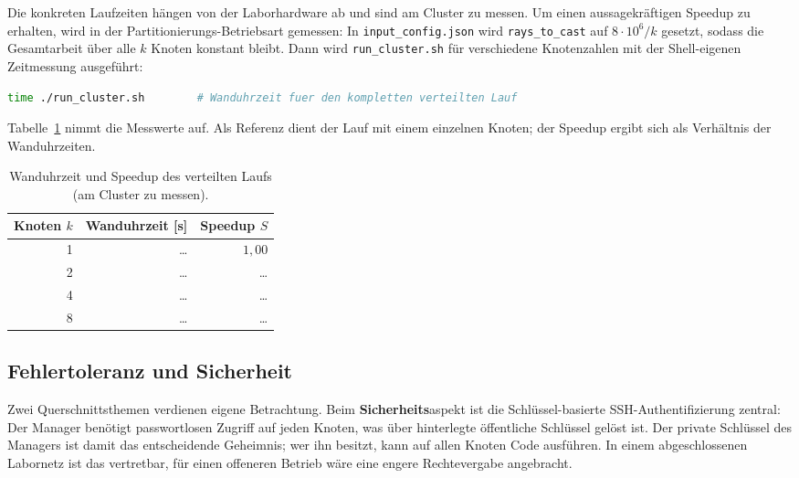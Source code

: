 Die konkreten Laufzeiten hängen von der Laborhardware ab und sind am Cluster zu
messen. Um einen aussagekräftigen Speedup zu erhalten, wird in der
Partitionierungs-Betriebsart gemessen: In \texttt{input\_config.json} wird
\texttt{rays\_to\_cast} auf $8\cdot10^{6}/k$ gesetzt, sodass die Gesamtarbeit über
alle $k$ Knoten konstant bleibt. Dann wird \texttt{run\_cluster.sh} für
verschiedene Knotenzahlen mit der Shell-eigenen Zeitmessung ausgeführt:

\begin{lstlisting}[style=clusterlst, language=bash, caption={Messvorschrift für die Laufzeit am Cluster.}]
time ./run_cluster.sh        # Wanduhrzeit fuer den kompletten verteilten Lauf
\end{lstlisting}

Tabelle~\ref{tab:speedup} nimmt die Messwerte auf. Als Referenz dient der Lauf mit
einem einzelnen Knoten; der Speedup ergibt sich als Verhältnis der Wanduhrzeiten.

\begin{table}[htbp]
    \centering
    \caption{Wanduhrzeit und Speedup des verteilten Laufs (am Cluster zu messen).}
    \label{tab:speedup}
    \begin{tabular}{r r r}
        \toprule
        Knoten $k$ & Wanduhrzeit [s] & Speedup $S$ \\
        \midrule
        1 & \dots & $1{,}00$ \\
        2 & \dots & \dots \\
        4 & \dots & \dots \\
        8 & \dots & \dots \\
        \bottomrule
    \end{tabular}
\end{table}

\subsection{Fehlertoleranz und Sicherheit}
\label{subsec:cluster-fehler}

Zwei Querschnittsthemen verdienen eigene Betrachtung. Beim \textbf{Sicherheits}aspekt
ist die Schlüssel-basierte SSH-Authentifizierung zentral: Der Manager benötigt
passwortlosen Zugriff auf jeden Knoten, was über hinterlegte öffentliche Schlüssel
gelöst ist. Der private Schlüssel des Managers ist damit das entscheidende
Geheimnis; wer ihn besitzt, kann auf allen Knoten Code ausführen. In einem
abgeschlossenen Labornetz ist das vertretbar, für einen offeneren Betrieb wäre eine
engere Rechtevergabe angebracht.


